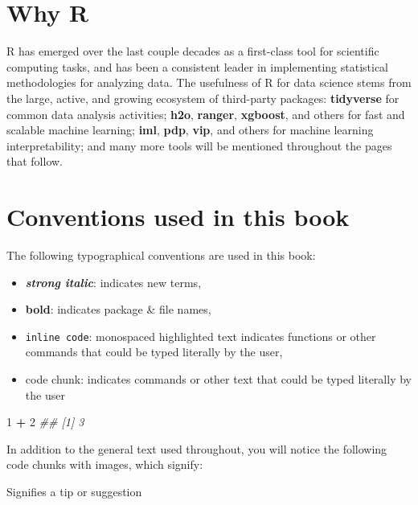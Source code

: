 \documentclass[]{krantz}
\makeatletter
\newenvironment{Shaded}{\begin{snugshade}}{\end{snugshade}}
\newcommand{\CommentTok}[1]{\textcolor[rgb]{0.37,0.37,0.37}{\textit{#1}}}
\newcommand{\DecValTok}[1]{\textcolor[rgb]{0.06,0.06,0.06}{#1}}
\newcommand{\OperatorTok}[1]{\textcolor[rgb]{0.43,0.43,0.43}{\textbf{#1}}}
\newcommand{\StringTok}[1]{\textcolor[rgb]{0.5,0.5,0.5}{#1}}
\providecommand{\tightlist}{%
  \setlength{\itemsep}{0pt}\setlength{\parskip}{0pt}}
\newenvironment{kframe}{%
\medskip{}
\setlength{\fboxsep}{.8em}
 \def\at@end@of@kframe{}%
 \ifinner\ifhmode%
  \def\at@end@of@kframe{\end{minipage}}%
  \begin{minipage}{\columnwidth}%
 \fi\fi%
 \def\FrameCommand##1{\hskip\@totalleftmargin \hskip-\fboxsep
 \colorbox{shadecolor}{##1}\hskip-\fboxsep
     \hskip-\linewidth \hskip-\@totalleftmargin \hskip\columnwidth}%
 \MakeFramed {\advance\hsize-\width
   \@totalleftmargin\z@ \linewidth\hsize
   \@setminipage}}%
 {\par\unskip\endMakeFramed%
 \at@end@of@kframe}
\newenvironment{block}[1]
  {
  \begin{itemize}
  \renewcommand{\labelitemi}{
    \raisebox{-.7\height}[0pt][0pt]{
      {\setkeys{Gin}{width=3em,keepaspectratio}\texttt{[image: icons/\#1]}}
    }
  }
  \setlength{\fboxsep}{1em}
  \begin{kframe}
  \item
  }
  {
  \end{kframe}
  \end{itemize}
  }
\newenvironment{tip}
  {\begin{block}{tip}}
  {\end{block}}
\renewenvironment{Shaded}{\begin{kframe}}{\end{kframe}}
\makeatother
\begin{document}
\hypertarget{why-r}{%
\section*{Why R}\label{why-r}}


R has emerged over the last couple decades as a first-class tool for scientific computing tasks, and has been a consistent leader in implementing statistical methodologies for analyzing data. The usefulness of R for data science stems from the large, active, and growing ecosystem of third-party packages: \textbf{tidyverse} for common data analysis activities; \textbf{h2o}, \textbf{ranger}, \textbf{xgboost}, and others for fast and scalable machine learning; \textbf{iml}, \textbf{pdp}, \textbf{vip}, and others for machine learning interpretability; and many more tools will be mentioned throughout the pages that follow.

\hypertarget{conventions-used-in-this-book}{%
\section*{Conventions used in this book}\label{conventions-used-in-this-book}}


The following typographical conventions are used in this book:

\begin{itemize}
\tightlist
\item
  \textbf{\emph{strong italic}}: indicates new terms,
\item
  \textbf{bold}: indicates package \& file names,
\item
  \texttt{inline\ code}: monospaced highlighted text indicates functions or other commands that could be typed literally by the user,
\item
  code chunk: indicates commands or other text that could be typed literally by the user
\end{itemize}

\begin{Shaded}
\begin{Highlighting}[]
\DecValTok{1} \OperatorTok{+}\StringTok{ }\DecValTok{2}
\CommentTok{## [1] 3}
\end{Highlighting}
\end{Shaded}

In addition to the general text used throughout, you will notice the following code chunks with images, which signify:

\begin{tip}
Signifies a tip or suggestion
\end{tip}
\end{document}
